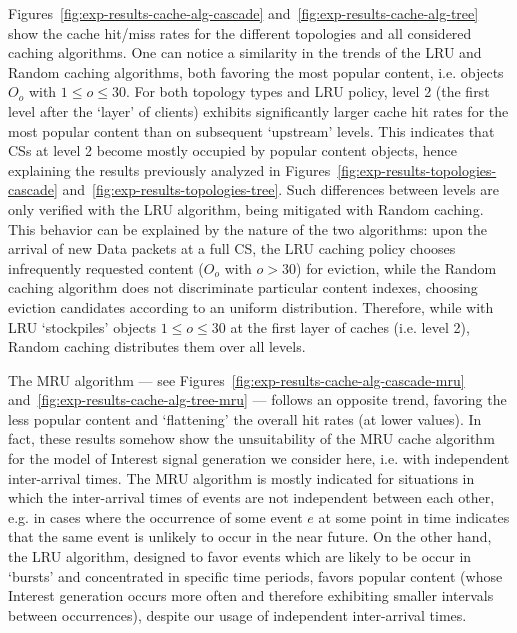 Figures~\ref{fig:exp-results-cache-alg-cascade} and~\ref{fig:exp-results-cache-alg-tree} 
show the cache hit\slash miss rates for the different topologies and all considered 
caching algorithms. One can notice a similarity in the trends of the LRU and Random caching 
algorithms, both favoring the most popular content, i.e. objects $O_o$ with 
$1 \le o \le 30$. For both topology types and LRU policy, level 2 (the first level after the 
`layer' of clients) exhibits significantly larger cache hit rates for the most 
popular content than on subsequent `upstream' levels. This indicates 
that CSs at level 2 become mostly occupied by popular content objects, hence explaining 
the results previously analyzed in Figures~\ref{fig:exp-results-topologies-cascade} 
and~\ref{fig:exp-results-topologies-tree}. Such differences between levels are 
only verified with the LRU algorithm, being mitigated with Random caching. This 
behavior can be explained by the nature of the 
two algorithms: upon the arrival of new Data packets at a full CS, the LRU 
caching policy chooses infrequently requested content ($O_o$ with $o > 30$) for 
eviction, while the Random caching algorithm does not discriminate 
particular content indexes, choosing eviction candidates according to an 
uniform distribution. Therefore, while with LRU `stockpiles' objects 
$1 \le o \le 30$ at the first layer of caches (i.e. level 2), Random caching 
distributes them over all levels.\shortvertbreak

The 
MRU algorithm --- see Figures~\ref{fig:exp-results-cache-alg-cascade-mru} 
and~\ref{fig:exp-results-cache-alg-tree-mru} --- follows an opposite trend, 
favoring the less popular content and `flattening' the overall hit rates (at lower 
values). In fact, these results somehow show the unsuitability of the MRU cache 
algorithm for the model of Interest signal generation we consider here, i.e. with 
independent inter-arrival times. The MRU algorithm is mostly indicated for 
situations in which the inter-arrival times of events are not independent between 
each other, e.g. in cases where the occurrence of some event $e$ at some point 
in time indicates that the same event is unlikely to occur in the near future. On the 
other hand, the LRU algorithm, designed to favor events which are likely to be occur 
in `bursts' and concentrated in specific time periods, favors popular content (whose Interest 
generation occurs more often and therefore exhibiting smaller intervals between occurrences), 
despite our usage of independent inter-arrival times.\shortvertbreak

